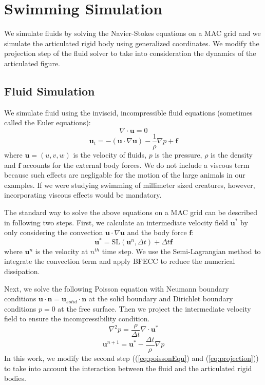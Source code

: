 \section{Swimming Simulation}

We simulate fluids by solving the Navier-Stokes equations on a MAC grid
and we simulate the articulated rigid body using generalized coordinates.
We modify the projection step of the fluid solver to take into
consideration the dynamics of the articulated figure.

\subsection{Fluid Simulation}

We simulate fluid using the inviscid, incompressible fluid equations
(sometimes called the Euler equations):
\begin{displaymath}
 \nabla\cdot\mathbf{u}=0
\end{displaymath}
\begin{displaymath}
 \mathbf{u}_t=-(\mathbf{u}\cdot\nabla\mathbf{u})-\frac{1}{\rho}\nabla
 p+\mathbf{f}
\end{displaymath}
where $\mathbf{u}=(u,v,w)$ is the velocity of fluids, $p$ is the pressure,
$\rho$ is the density and $\mathbf{f}$ accounts for the external body
forces.  We do not include a viscous term because such effects are
negligable for the motion of the large animals in our examples.  If we
were studying swimming of millimeter sized creatures, however,
incorporating viscous effects would be mandatory.

The standard way to solve the above equations on a MAC grid can be described in following two steps. First, we calculate an intermediate velocity field $\mathbf{u}^*$ by only considering the convection $\mathbf{u}\cdot\nabla\mathbf{u}$ and the body force $\mathbf{f}$:
\begin{equation}
 \mathbf{u}^*=\textrm{SL}(\mathbf{u}^n,\Delta t)+\Delta t\mathbf{f}
\label{eq:sl}
\end{equation}
where $\mathbf{u}^n$ is the velocity at $n^{th}$ time step.
We use the Semi-Lagrangian method \cite{stam99stablefluids} to integrate the convection term and apply BFECC \cite{kim06advectionswith} to reduce the numerical dissipation.

Next, we solve the following Poisson equation with Neumann boundary conditions $\mathbf{u}\cdot\mathbf{n}=\mathbf{u}_{solid}\cdot\mathbf{n}$ at the solid boundary and Dirichlet
boundary conditions $p = 0$ at the free surface. Then we project the intermediate velocity field to ensure the incompressibility condition.
\begin{equation}
\label{eq:poissonEqu}
 \nabla^2 p=\frac{\rho}{\Delta t}\nabla\cdot\mathbf{u}^*
\end{equation}
\begin{equation}
\label{eq:projection}
 \mathbf{u}^{n+1}=\mathbf{u}^*-\frac{\Delta t}{\rho}\nabla p
\end{equation}
In this work, we modify the second step ((\ref{eq:poissonEqu}) and (\ref{eq:projection})) to take into account the interaction between the fluid and the articulated rigid bodies.

